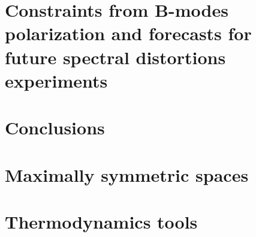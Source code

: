 \documentclass[12pt,a4paper]{book}
\begin{document}
\chapter{Constraints from B-modes polarization and forecasts
 for future spectral distortions experiments}



\chapter*{Conclusions}



\appendix
\chapter{Maximally symmetric spaces}

\chapter{Thermodynamics tools}




 
  
\end{document}
